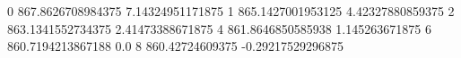 0 867.8626708984375 7.14324951171875
1 865.1427001953125 4.42327880859375
2 863.1341552734375 2.41473388671875
4 861.8646850585938 1.145263671875
6 860.7194213867188 0.0
8 860.42724609375 -0.29217529296875
